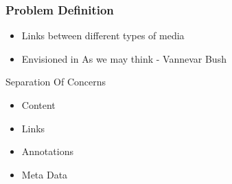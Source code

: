 \begin{frame}
\frametitle{Problem Definition}
	\begin{block}{}
		\begin{itemize}
			\item Links between different types of media
			\item Envisioned in As we may think - Vannevar Bush
		\end{itemize}
	\end{block}
	\begin{block}{Separation Of Concerns}
		\begin{itemize}
			\item Content
			\item Links
			\item Annotations
			\item Meta Data
		\end{itemize}
	\end{block}
\end{frame}
